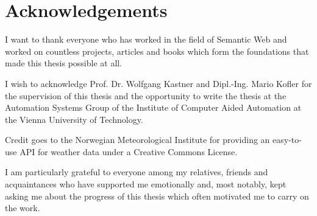 \chapter*{Acknowledgements}

I want to thank everyone who has worked in the field of Semantic Web and worked on countless projects, articles and books which form the foundations that made this thesis possible at all.

I wish to acknowledge Prof. Dr. Wolfgang Kastner and Dipl.-Ing. Mario Kofler for the supervision of this thesis and the opportunity to write the thesis at the Automation Systems Group of the Institute of Computer Aided Automation at the Vienna University of Technology.

Credit goes to the Norwegian Meteorological Institute for providing an easy-to-use API for weather data under a Creative Commons License.

I am particularly grateful to everyone among my relatives, friends and acquaintances who have supported me emotionally and, most notably, kept asking me about the progress of this thesis which often motivated me to carry on the work.